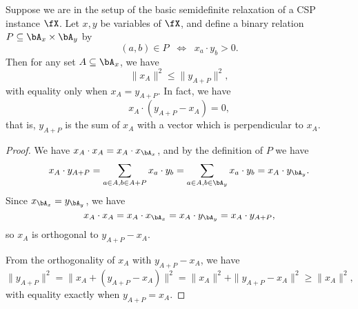\begin{lem}\label{sdp-weak-prague} Suppose we are in the setup of the basic semidefinite relaxation of a CSP instance $\fX$. Let $x,y$ be variables of $\fX$, and define a binary relation $P \subseteq \bA_x \times \bA_y$ by
\[
(a,b) \in P \;\; \iff \;\; x_a \cdot y_b > 0.
\]
Then for any set $A \subseteq \bA_x$, we have
\[
\|x_A\|^2 \le \|y_{A+P}\|^2,
\]
with equality only when $x_A = y_{A+P}$. In fact, we have
\[
x_A \cdot (y_{A+P} - x_A) = 0,
\]
that is, $y_{A+P}$ is the sum of $x_A$ with a vector which is perpendicular to $x_A$.
\end{lem}
\begin{proof} We have $x_A\cdot x_A = x_A \cdot x_{\bA_x}$, and by the definition of $P$ we have
\[
x_A \cdot y_{A+P} = \sum_{a\in A, b \in A+P} x_a \cdot y_b = \sum_{a\in A, b \in \bA_y} x_a \cdot y_b = x_A \cdot y_{\bA_y}.
\]
Since $x_{\bA_x} = y_{\bA_y}$, we have
\[
x_A \cdot x_A = x_A \cdot x_{\bA_x} = x_A \cdot y_{\bA_y} = x_A \cdot y_{A+P},
\]
so $x_A$ is orthogonal to $y_{A+P} - x_A$.

From the orthogonality of $x_A$ with $y_{A+P} - x_A$, we have
\[
\|y_{A+P}\|^2 = \|x_A + (y_{A+P} - x_A)\|^2 = \|x_A\|^2 + \|y_{A+P} - x_A\|^2 \ge \|x_A\|^2,
\]
with equality exactly when $y_{A+P} = x_A$.
\end{proof}

